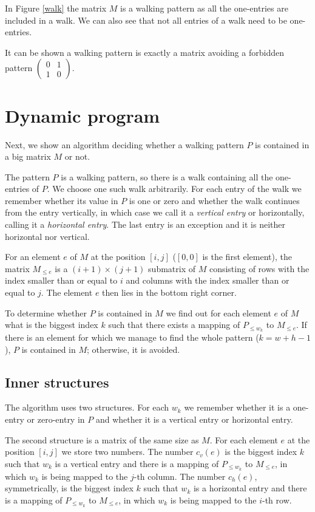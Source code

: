 In Figure \ref{walk} the matrix $M$ is a walking pattern as all the one-entries are included in a walk. We can also see that not all entries of a walk need to be one-entries.

It can be shown a walking pattern is exactly a matrix avoiding a forbidden pattern $\left(\begin{smallmatrix}
0 & 1 \\
1 & 0
\end{smallmatrix}\right)$.

\section{Dynamic program}
Next, we show an algorithm deciding whether a walking pattern $P$ is contained in a big matrix $M$ or not.

The pattern $P$ is a walking pattern, so there is a walk containing all the one-entries of $P$. We choose one such walk arbitrarily. For each entry of the walk we remember whether its value in $P$ is one or zero and whether the walk continues from the entry vertically, in which case we call it a \emph{vertical entry} or horizontally, calling it a \emph{horizontal entry}. The last entry is an exception and it is neither horizontal nor vertical.
\begin{defn}
For an element $e$ of $M$ at the position $[i,j]$ ($[0,0]$ is the first element), the matrix $M_{\leq e}$ is a $(i+1)\times(j+1)$ submatrix of $M$ consisting of rows with the index smaller than or equal to $i$ and columns with the index smaller than or equal to $j$. The element $e$ then lies in the bottom right corner.
\end{defn}
To determine whether $P$ is contained in $M$ we find out for each element $e$ of $M$ what is the biggest index $k$ such that there exists a mapping of $P_{\leq w_k}$ to $M_{\leq e}$. If there is an element for which we manage to find the whole pattern ($k=w+h-1$), $P$ is contained in $M$; otherwise, it is avoided.

\subsection{Inner structures}
The algorithm uses two structures. For each $w_k$ we remember whether it is a one-entry or zero-entry in $P$ and whether it is a vertical entry or horizontal entry.

The second structure is a matrix of the same size as $M$. For each element $e$ at the position $[i,j]$ we store two numbers. The number $c_v(e)$ is the biggest index $k$ such that $w_k$ is a vertical entry and there is a mapping of $P_{\leq w_k}$ to $M_{\leq e}$, in which $w_k$ is being mapped to the $j$-th column. The number $c_h(e)$, symmetrically, is the biggest index $k$ such that $w_k$ is a horizontal entry and there is a mapping of $P_{\leq w_k}$ to $M_{\leq e}$, in which $w_k$ is being mapped to the $i$-th row.

